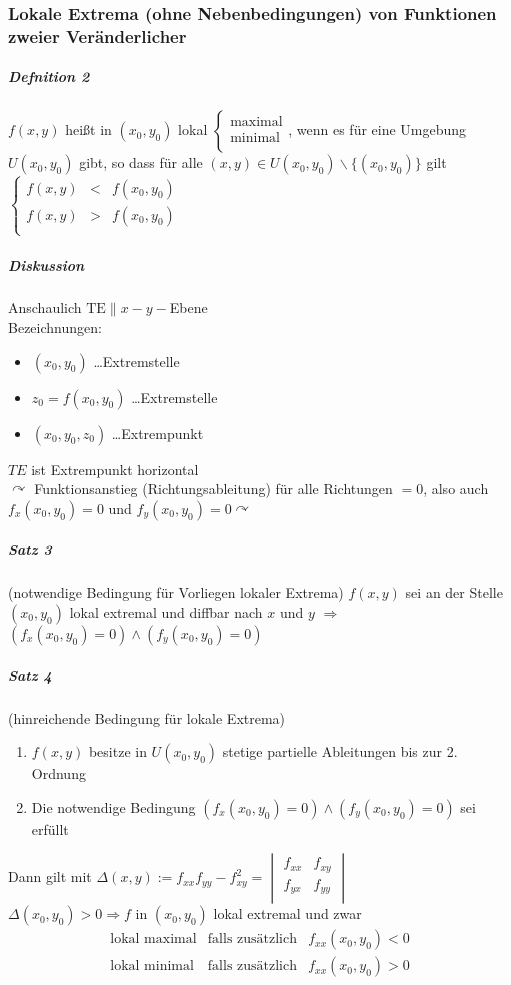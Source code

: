 \documentclass[a4paper]{scrartcl}
\begin{document}
\subsubsection{Lokale Extrema (ohne Nebenbedingungen) von Funktionen zweier Veränderlicher}
\subparagraph{Defnition 2} $f(x,y)$ heißt in $(x_0,y_0)$ lokal $\left \{ \begin{array}{c} \text{maximal} \\ \text{minimal} \\ \end{array} \right.$, wenn es für eine Umgebung $U(x_0,y_0)$ gibt, so dass für alle $(x,y) \in U(x_0,y_0) \backslash \{ (x_0,y_0) \}$ gilt $\left \{ \begin{array}{lcr} f(x,y) & < & f(x_0,y_0) \\ f(x,y) & > & f(x_0,y_0)\\ \end{array} \right.$

\subparagraph{Diskussion} Anschaulich $\text{TE} \parallel x-y-$Ebene\\
Bezeichnungen:
\begin{itemize}
\item $(x_0,y_0) $ \dots Extremstelle
\item $z_0 = f(x_0,y_0)$ \dots Extremstelle
\item $(x_0,y_0,z_0)$ \dots Extrempunkt
\end{itemize}
$TE$ ist Extrempunkt horizontal\\
$\curvearrowright$ Funktionsanstieg (Richtungsableitung) für alle Richtungen $=0$, also auch $f_x (x_0,y_0) = 0$ und $f_y(x_0,y_0) = 0 \curvearrowright$

\subparagraph{Satz 3} (notwendige Bedingung für Vorliegen lokaler Extrema)
$f(x,y)$ sei  an der Stelle $(x_0,y_0)$ lokal extremal und diffbar nach $x$ und $y$ $\Rightarrow$ $(f_x(x_0,y_0) = 0) \wedge (f_y (x_0,y_0) = 0)$

\subparagraph{Satz 4} (hinreichende Bedingung für lokale Extrema)
\begin{enumerate}
\item $f(x,y)$ besitze in $U(x_0,y_0)$ stetige partielle Ableitungen bis zur 2. Ordnung
\item Die notwendige Bedingung $(f_x(x_0,y_0) = 0) \wedge (f_y (x_0,y_0) = 0)$ sei erfüllt
\end{enumerate}
Dann gilt mit $\Delta(x,y) := f_{xx}f_{yy} - f_{xy}^2 = \begin{vmatrix} f_{xx} & f_{xy} \\ f_{yx} & f_{yy} \\ \end{vmatrix}$\\
$\Delta (x_0,y_0) > 0 \Rightarrow f \text{ in } (x_0,y_0)$ lokal extremal und zwar
\begin{equation}\label{5411} \begin{array}{lcr} \text{lokal maximal} & \text{falls zusätzlich} & f_{xx}(x_0,y_0) <0 \\ \text{lokal minimal} & \text{falls zusätzlich} & f_{xx}(x_0,y_0) > 0 \\ \end{array}
\end{equation}
\end{document}
